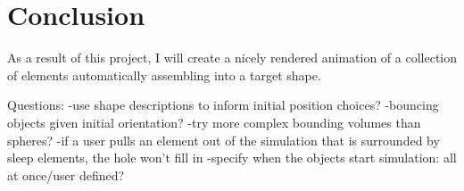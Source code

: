\documentclass{article}
\begin{document}
\section{Conclusion}	

	
	As a result of this project, I will create a nicely rendered animation of a collection of elements automatically assembling into a target shape.

Questions:
-use shape descriptions to inform initial position choices?
-bouncing objects given initial orientation?
-try more complex bounding volumes than spheres?
-if a user pulls an element out of the simulation that is surrounded by sleep elements, the hole won't fill in
-specify when the objects start simulation: all at once/user defined?









\end{document}
